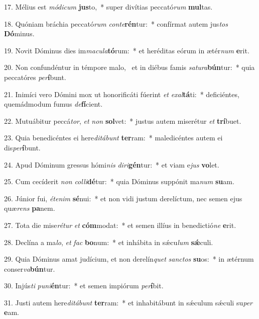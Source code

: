 17. Mélius est \textit{mó}\textit{di}\textit{cum} \textbf{jus}to,~*  super divítias peccató\textit{rum} \textbf{mul}tas.\

18. Quóniam bráchia peccató\textit{rum} \textit{con}\textit{te}\textbf{rén}tur:~*  confírmat autem jus\textit{tos} \textbf{Dó}minus.\

19. Novit Dóminus dies im\textit{ma}\textit{cu}\textit{la}\textbf{tó}rum:~*  et heréditas eórum in ætér\textit{num} \textbf{e}rit.\

20. Non confundéntur in témpore malo, \dag\  et in diébus famis \textit{sa}\textit{tu}\textit{ra}\textbf{bún}tur:~*  quia peccatóres \textit{per}\textbf{í}bunt.\

21. Inimíci vero Dómini mox ut honorificáti fúerint \textit{et} \textit{ex}\textit{al}\textbf{tá}ti:~*  deficiéntes, quemádmodum fumus \textit{de}\textbf{fí}cient.\

22. Mutuábitur peccá\textit{tor}, \textit{et} \textit{non} \textbf{sol}vet:~*  justus autem miserétur \textit{et} \textbf{trí}buet.\

23. Quia benedicéntes ei here\textit{di}\textit{tá}\textit{bunt} \textbf{ter}ram:~*  maledicéntes autem ei dis\textit{per}\textbf{í}bunt.\

24. Apud Dóminum gressus hómi\textit{nis} \textit{di}\textit{ri}\textbf{gén}tur:~*  et viam e\textit{jus} \textbf{vo}let.\

25. Cum cecíderit \textit{non} \textit{col}\textit{li}\textbf{dé}tur:~*  quia Dóminus suppónit ma\textit{num} \textbf{su}am.\

26. Júnior fui, \textit{ét}\textit{e}\textit{nim} \textbf{sé}nui:~*  et non vidi justum derelíctum, nec semen ejus quæ\textit{rens} \textbf{pa}nem.\

27. Tota die mise\textit{ré}\textit{tur} \textit{et} \textbf{cóm}modat:~*  et semen illíus in benedictió\textit{ne} \textbf{e}rit.\

28. Declína a ma\textit{lo}, \textit{et} \textit{fac} \textbf{bo}num:~*  et inhábita in sǽcu\textit{lum} \textbf{sǽ}culi.\

29. Quia Dóminus amat judícium, et non derelín\textit{quet} \textit{sanc}\textit{tos} \textbf{su}os:~*  in ætérnum conser\textit{va}\textbf{bún}tur.\

30. Injús\textit{ti} \textit{pu}\textit{ni}\textbf{én}tur:~*  et semen impiórum \textit{per}\textbf{í}bit.\

31. Justi autem here\textit{di}\textit{tá}\textit{bunt} \textbf{ter}ram:~*  et inhabitábunt in sǽculum sǽculi su\textit{per} \textbf{e}am.\

